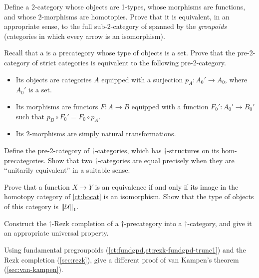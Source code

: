 \begin{ex}\label{ct:groupoids}
  Define a 2-category whose objects are 1-types, whose morphisms are functions, and whose 2-morphisms are homotopies.
  Prove that it is equivalent, in an appropriate sense, to the full sub-2-category of \ucat spanned by the \emph{groupoids} (categories in which every arrow is an isomorphism).
\end{ex}

\begin{ex}
  Recall that a  is a precategory whose type of objects is a set.
  Prove that the pre-2-category of strict categories is equivalent to the following pre-2-category.
  \begin{itemize}
  \item Its objects are categories $A$ equipped with a surjection
    $p_A:A_0'\to A_0$, where $A_0'$ is a set.
  \item Its morphisms are functors $F:A\to B$ equipped with a function $F_0':A_0' \to B_0'$ such that $p_B \circ F_0' = F_0 \circ p_A$.
  \item Its 2-morphisms are simply natural transformations.
  \end{itemize}
\end{ex}

\begin{ex}
  Define the pre-2-category of $\dagger$-categories, which has $\dagger$-structures on its hom-precategories.
  Show that two $\dagger$-categories are equal precisely when they are ``unitarily equivalent'' in a suitable sense.
\end{ex}

\begin{ex}\label{ct:ex:hocat}
  Prove that a function $X\to Y$ is an equivalence if and only if its image in the homotopy category of \autoref{ct:hocat} is an isomorphism.
  Show that the type of objects of this category is $\mathopen{}\left\Vert \mathcal{U}\right\Vert_{1}\mathclose{}$.
\end{ex}

\begin{ex}
  Construct the $\dagger$-Rezk completion of a $\dagger$-precategory into a $\dagger$-category, and give it an appropriate universal property.
\end{ex}

\begin{ex}\label{ex:rezk-vankampen}
  Using fundamental pregroupoids (\autoref{ct:fundgpd,ct:rezk-fundgpd-trunc1}) and the Rezk completion (\autoref{sec:rezk}), give a different proof of van Kampen's theorem (\autoref{sec:van-kampen}).
\end{ex}



